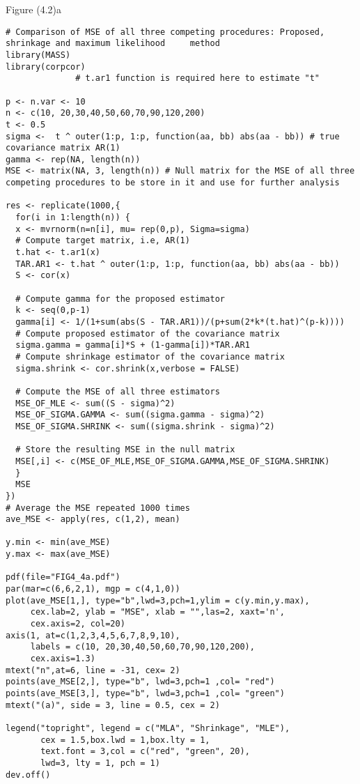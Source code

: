 Figure (4.2)a
\begin{lstlisting}
# Comparison of MSE of all three competing procedures: Proposed, shrinkage and maximum likelihood     method 
library(MASS)
library(corpcor)
              # t.ar1 function is required here to estimate "t"

p <- n.var <- 10
n <- c(10, 20,30,40,50,60,70,90,120,200)
t <- 0.5
sigma <-  t ^ outer(1:p, 1:p, function(aa, bb) abs(aa - bb)) # true covariance matrix AR(1)
gamma <- rep(NA, length(n))
MSE <- matrix(NA, 3, length(n)) # Null matrix for the MSE of all three competing procedures to be store in it and use for further analysis

res <- replicate(1000,{
  for(i in 1:length(n)) {
  x <- mvrnorm(n=n[i], mu= rep(0,p), Sigma=sigma)
  # Compute target matrix, i.e, AR(1)
  t.hat <- t.ar1(x)
  TAR.AR1 <- t.hat ^ outer(1:p, 1:p, function(aa, bb) abs(aa - bb))
  S <- cor(x)
  
  # Compute gamma for the proposed estimator
  k <- seq(0,p-1)
  gamma[i] <- 1/(1+sum(abs(S - TAR.AR1))/(p+sum(2*k*(t.hat)^(p-k))))
  # Compute proposed estimator of the covariance matrix
  sigma.gamma = gamma[i]*S + (1-gamma[i])*TAR.AR1
  # Compute shrinkage estimator of the covariance matrix
  sigma.shrink <- cor.shrink(x,verbose = FALSE)
  
  # Compute the MSE of all three estimators
  MSE_OF_MLE <- sum((S - sigma)^2)
  MSE_OF_SIGMA.GAMMA <- sum((sigma.gamma - sigma)^2)
  MSE_OF_SIGMA.SHRINK <- sum((sigma.shrink - sigma)^2)
  
  # Store the resulting MSE in the null matrix
  MSE[,i] <- c(MSE_OF_MLE,MSE_OF_SIGMA.GAMMA,MSE_OF_SIGMA.SHRINK)
  }
  MSE
})
# Average the MSE repeated 1000 times
ave_MSE <- apply(res, c(1,2), mean)

y.min <- min(ave_MSE)
y.max <- max(ave_MSE)

pdf(file="FIG4_4a.pdf")
par(mar=c(6,6,2,1), mgp = c(4,1,0))
plot(ave_MSE[1,], type="b",lwd=3,pch=1,ylim = c(y.min,y.max),
     cex.lab=2, ylab = "MSE", xlab = "",las=2, xaxt='n',
     cex.axis=2, col=20)
axis(1, at=c(1,2,3,4,5,6,7,8,9,10),
     labels = c(10, 20,30,40,50,60,70,90,120,200),
     cex.axis=1.3)
mtext("n",at=6, line = -31, cex= 2)
points(ave_MSE[2,], type="b", lwd=3,pch=1 ,col= "red")
points(ave_MSE[3,], type="b", lwd=3,pch=1 ,col= "green")
mtext("(a)", side = 3, line = 0.5, cex = 2)

legend("topright", legend = c("MLA", "Shrinkage", "MLE"),
       cex = 1.5,box.lwd = 1,box.lty = 1,
       text.font = 3,col = c("red", "green", 20),
       lwd=3, lty = 1, pch = 1)
dev.off()
\end{lstlisting}


